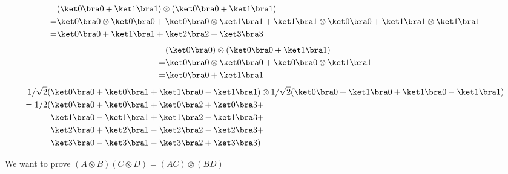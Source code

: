 \begin{align*}
  &(\ket 0 \bra 0 + \ket 1 \bra 1) \otimes (\ket 0 \bra 0 + \ket 1 \bra 1) \\
  =& \ket 0 \bra 0 \otimes \ket 0 \bra 0 + \ket 0 \bra 0 \otimes \ket 1 \bra 1 +
  \ket 1 \bra 1 \otimes \ket 0 \bra 0 + \ket 1 \bra 1 \otimes \ket 1 \bra 1 \\
  =& \ket 0 \bra 0 + \ket 1 \bra 1 + \ket 2 \bra 2 +\ket 3 \bra 3
\end{align*}
\begin{align*}
  &(\ket 0 \bra 0) \otimes (\ket 0 \bra 0 + \ket 1 \bra 1) \\
  =& \ket 0 \bra 0 \otimes \ket 0 \bra 0 + \ket 0 \bra 0 \otimes \ket 1 \bra 1
  \\
  =& \ket 0 \bra 0 + \ket 1 \bra 1
\end{align*}
\begin{align*}
  1/\sqrt 2  (&\ket 0 \bra 0 + \ket 0 \bra 1 + \ket 1 \bra 0 - \ket 1 \bra 1 )
    \otimes 1/\sqrt 2 (\ket 0 \bra 0 + \ket 1 \bra 0 + \ket 1 \bra 0 - \ket 1
    \bra 1) \\
  =1/2 (&\ket 0 \bra 0 + \ket 0 \bra 1 + \ket 0 \bra 2 + \ket 0 \bra 3 + \\
   &\ket 1 \bra 0 - \ket 1 \bra 1 + \ket 1 \bra 2 - \ket 1 \bra 3 + \\
   &\ket 2 \bra 0 + \ket 2 \bra 1 - \ket 2 \bra 2 - \ket 2 \bra 3 + \\
   &\ket 3 \bra 0 - \ket 3 \bra 1 - \ket 3 \bra 2 + \ket 3 \bra 3)
\end{align*}

\newpage

We want to prove $(A \otimes B) (C \otimes D) = (AC) \otimes (BD)$

